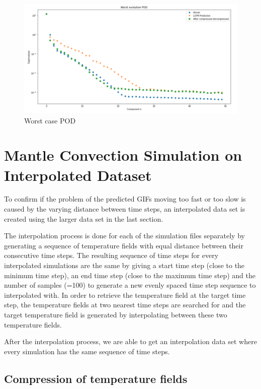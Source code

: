 \begin{figure}[H]
    \caption{Worst case POD}
    \includegraphics[scale=0.5]{Report LaTeX/figures/mantle_convection_images/larger_dataset/LSTM_Worst_POD.png}
\end{figure}






\section{Mantle Convection Simulation on Interpolated Dataset}

To confirm if the problem of the predicted GIFs moving too fast or too slow is caused by the varying distance between time steps, an interpolated data set is created using the larger data set in the last section.

The interpolation process is done for each of the simulation files separately by generating a sequence of temperature fields with equal distance between their consecutive time steps. The resulting sequence of time steps for every interpolated simulations are the same by giving a start time step (close to the minimum time step), an end time step (close to the maximum time step) and the number of samples (=100) to generate a new evenly spaced time step sequence to interpolated with. In order to retrieve the temperature field at the target time step, the temperature fields at two nearest time steps are searched for  and the target temperature field is generated by interpolating between these two temperature fields.

After the interpolation process, we are able to get an interpolation data set where every simulation has the same sequence of time steps.


\subsection{Compression of temperature fields}

